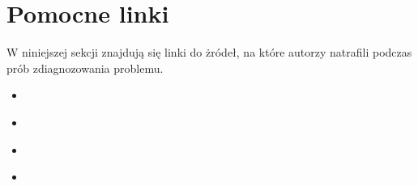 \documentclass[10pt,a4paper]{article}
\begin{document}
\section{Pomocne linki}
W niniejszej sekcji znajdują się linki do żródeł, na które autorzy natrafili podczas prób zdiagnozowania problemu.
\begin{itemize}
\item \cite[Atrykuł przedstawiający ładowanie ShapeFile do bazy danych PostGIS]{loadShpDataIntoPostGis}
\item \cite[Atrykuł pokazujący obsługę GeoSerwera]{servepostgisdata1}
\item \cite[Wątek opisujący załadowanie pliku z bazą danych eESRI i konwersje fo Shapefile'a]{loadESRIDataAndConvertToShape}
\item \cite[Strona Wiki opisująca sposób ekstrakcji danych geograficznych do bazy postGisowej]{osmToPostGIS}
\end{itemize}
{}

\end{document}
